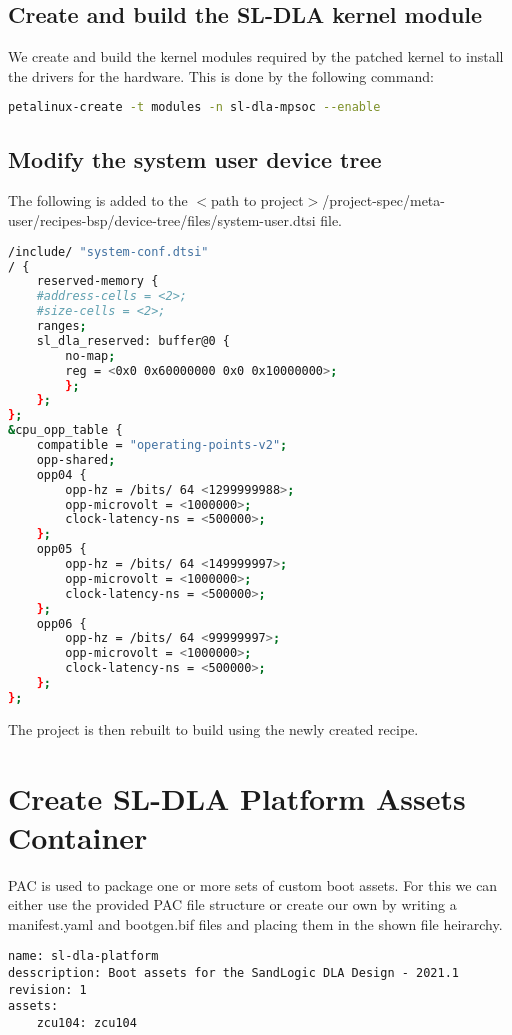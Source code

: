 \documentclass{article}
\begin{document}
\subsection{Create and build the SL-DLA kernel module}
We create and build the kernel modules required by the patched kernel to install the drivers for the hardware.
This is done by the following command:
\begin{lstlisting}[language=bash]
petalinux-create -t modules -n sl-dla-mpsoc --enable
\end{lstlisting}

\subsection{Modify the system user device tree}
The following is added to the $<$path to project$>$/project-spec/meta-user/recipes-bsp/device-tree/files/system-user.dtsi
file.
\begin{lstlisting}[language=bash]
/include/ "system-conf.dtsi"
/ {
    reserved-memory {
    #address-cells = <2>;
    #size-cells = <2>;
    ranges;
    sl_dla_reserved: buffer@0 {
        no-map;
        reg = <0x0 0x60000000 0x0 0x10000000>;
        };
    };
};
&cpu_opp_table {
    compatible = "operating-points-v2";
    opp-shared;
    opp04 {
        opp-hz = /bits/ 64 <1299999988>;
        opp-microvolt = <1000000>;
        clock-latency-ns = <500000>;
    };
    opp05 {
        opp-hz = /bits/ 64 <149999997>;
        opp-microvolt = <1000000>;
        clock-latency-ns = <500000>;
    };
    opp06 {
        opp-hz = /bits/ 64 <99999997>;
        opp-microvolt = <1000000>;
        clock-latency-ns = <500000>;
    };
};
\end{lstlisting}

The project is then rebuilt to build using the newly created recipe.

\section{Create SL-DLA Platform Assets Container}
PAC is used to package one or more sets of custom boot assets. For this we can either use the provided PAC file
structure or create our own by writing a manifest.yaml and bootgen.bif files and placing them in the shown file
heirarchy.

\begin{lstlisting}[caption=manifest.yaml]
name: sl-dla-platform
desscription: Boot assets for the SandLogic DLA Design - 2021.1
revision: 1
assets:
    zcu104: zcu104
\end{lstlisting}
\end{document}
